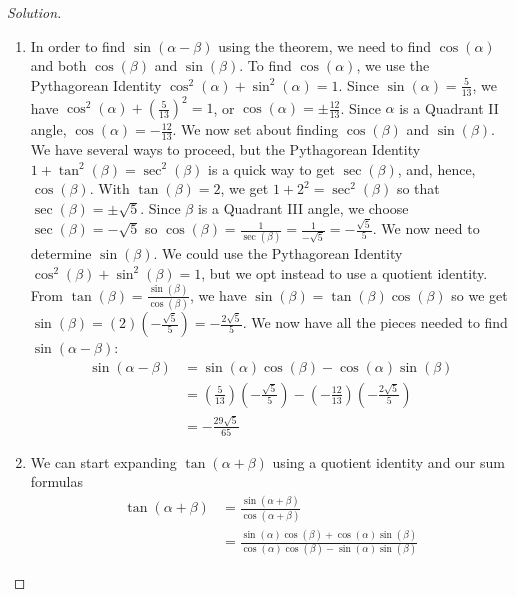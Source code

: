 \documentclass{ximera}
\begin{document}
\begin{example}
\begin{proof}[Solution]
\begin{enumerate}
      \item In order to find \( \sin(\alpha - \beta) \) using the theorem, we need to find \( \cos(\alpha) \) and both \( \cos(\beta) \) and \( \sin(\beta) \).
      To find \( \cos(\alpha) \), we use the Pythagorean Identity \( \cos^2(\alpha) + \sin^2(\alpha) = 1 \).
      Since \( \sin(\alpha) = \frac{5}{13} \), we have \( \cos^{2}(\alpha) + \left(\frac{5}{13}\right)^2 = 1 \), or \( \cos(\alpha) = \pm \frac{12}{13} \). 
      Since \( \alpha \) is a Quadrant II angle, \( \cos(\alpha) = -\frac{12}{13}\).
      We now set about finding \( \cos(\beta) \) and \( \sin(\beta) \).
      We have several ways to proceed, but the Pythagorean Identity \( 1 + \tan^{2}(\beta) = \sec^{2}(\beta) \) is a quick way to get \( \sec(\beta) \), and, hence, \( \cos(\beta) \).
      With \( \tan(\beta) = 2 \), we get \( 1 + 2^2 = \sec^{2}(\beta) \) so that \( \sec(\beta) = \pm\sqrt{5} \).
      Since \( \beta \) is a Quadrant III angle, we choose \( \sec(\beta) =  -\sqrt{5} \) so \( \cos(\beta) = \frac{1}{\sec(\beta)} = \frac{1}{-\sqrt{5}} = -\frac{\sqrt{5}}{5} \).
      We now need to determine \( \sin(\beta) \).
      We could use the Pythagorean Identity \( \cos^{2}(\beta) + \sin^{2}(\beta) = 1 \), but we opt instead to use a quotient identity.
      From \( \tan(\beta) = \frac{\sin(\beta)}{\cos(\beta)} \), we have \( \sin(\beta) = \tan(\beta)\cos(\beta) \) so we get \( \sin(\beta) = (2) \left(-\frac{\sqrt{5}}{5}\right) = -\frac{2 \sqrt{5}}{5} \).
      We now have all the pieces needed to find \( \sin(\alpha - \beta) \):
      \begin{align*}
        \sin(\alpha - \beta) &= \sin(\alpha)\cos(\beta) - \cos(\alpha)\sin(\beta) \\
        &= \left( \frac{5}{13} \right)\left( -\frac{\sqrt{5}}{5} \right) - \left( -\frac{12}{13} \right)\left( - \frac{2 \sqrt{5}}{5} \right) \\
        &= \boxed{-\frac{29\sqrt{5}}{65}}
      \end{align*}

      \item We can start expanding \( \tan(\alpha + \beta) \) using a quotient identity and our sum formulas
      \vspace{-.1in}
      \begin{align*}
        \tan(\alpha + \beta) &= \frac{\sin(\alpha + \beta)}{\cos(\alpha + \beta)} \\[10pt]
        &= \frac{\sin(\alpha) \cos(\beta) + \cos(\alpha) \sin(\beta)}{\cos(\alpha) \cos(\beta) - \sin(\alpha) \sin(\beta)}
      \end{align*}
      

\end{enumerate}
\end{proof}
\end{example}
\end{document}

